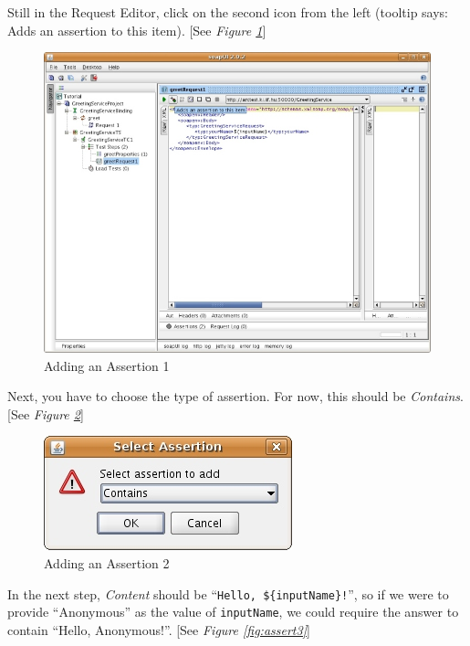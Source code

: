 \documentclass{article}
\begin{document}
Still in the Request Editor, click on the second icon from the left
(tooltip says: Adds an assertion to this item). [See \emph{Figure \ref{fig:assert1}}]

\begin{figure}[!hbp]
\begin{center}
\includegraphics{fig/ARC1PythonDGDraft-img10_resize.jpg}
\caption{Adding an Assertion 1}
\label{fig:assert1}
\end{center}
\end{figure}

Next, you have to choose the type of assertion. For now, this should
be \textit{Contains}. [See \emph{Figure \ref{fig:assert2}}]

\begin{figure}[!hbp]
\begin{center}
\includegraphics{fig/ARC1PythonDGDraft-img11.jpg}
\caption{Adding an Assertion 2}
\label{fig:assert2}
\end{center}
\end{figure}

In the next step, \textit{Content} should be
``\verb#Hello, ${inputName}!#'', so if we were to provide
``Anonymous'' as the value of \verb#inputName#, we could require the
answer to contain ``Hello, Anonymous!''. [See \emph{Figure \ref{fig:assert3}}]
\end{document}
